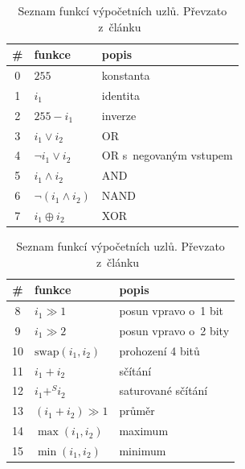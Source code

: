 \begin{table}[htb]
    \caption{Seznam funkcí výpočetních uzlů. Převzato z~článku~\cite{SikuPPSN}}
    \renewcommand{\arraystretch}{1.2}
    \begin{minipage}[t]{.5\textwidth}
        \small\centering\begin{tabular}{cll}
            \toprule
            \# & funkce & popis \\
            \midrule
            0 & $255$ & konstanta \\
            1 & $i_1$ & identita \\
            2 & $255 - i_1$ & inverze \\
            3 & $i_1 \vee i_2$ & OR \\
            4 & $\neg i_1 \vee i_2$ & OR s~negovaným vstupem \\
            5 & $i_1 \wedge i_2$ & AND \\
            6 & $\neg (i_1 \wedge i_2)$ & NAND \\
            7 & $i_1 \oplus i_2$ & XOR \\
            \bottomrule
        \end{tabular}

    \end{minipage}
    \begin{minipage}[t]{.5\textwidth}
        \small\centering\begin{tabular}{cll}
            \toprule
            \# & funkce & popis \\
            \midrule
            8 & $i_1 \gg 1$ & posun vpravo o~1 bit \\
            9 & $i_1 \gg 2$ & posun vpravo o~2 bity \\
            10 & $\mathrm{swap}(i_1, i_2)$ & prohození 4 bitů \\
            11 & $i_1 + i_2$ & sčítání \\
            12 & $i_1 +^S i_2$ & saturované sčítání \\
            13 & $(i_1 + i_2) \gg 1$ & průměr \\
            14 & $\max(i_1, i_2)$ & maximum \\
            15 & $\min(i_1, i_2)$ & minimum \\
            \bottomrule
        \end{tabular}

    \end{minipage}
    \label{tabCGPFunctions}
\end{table}

